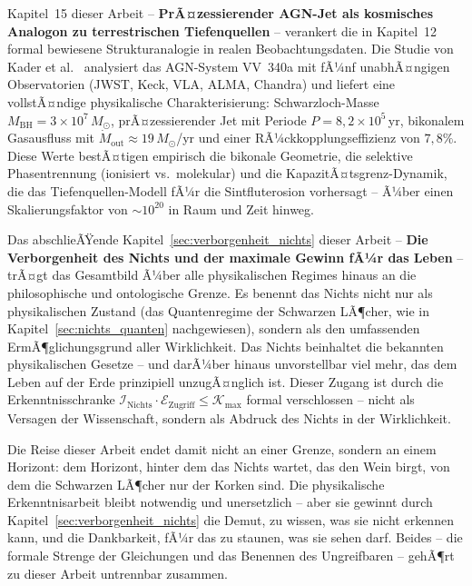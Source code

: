 ﻿\documentclass[12pt,a4paper]{report}
\begin{document}
\medskip

Kapitel~15 dieser Arbeit -- \textbf{PrÃ¤zessierender AGN-Jet als kosmisches Analogon zu terrestrischen Tiefenquellen} -- verankert die in Kapitel~12 formal bewiesene Strukturanalogie in realen Beobachtungsdaten. Die Studie von Kader et al.\ \cite{kader2026} analysiert das AGN-System VV~340a mit fÃ¼nf unabhÃ¤ngigen Observatorien (JWST, Keck, VLA, ALMA, Chandra) und liefert eine vollstÃ¤ndige physikalische Charakterisierung: Schwarzloch-Masse $M_\mathrm{BH} = 3 \times 10^7\,M_\odot$, prÃ¤zessierender Jet mit Periode $P = 8{,}2 \times 10^5$\,yr, bikonalem Gasausfluss mit $\dot{M}_\mathrm{out} \approx 19\,M_\odot$/yr und einer RÃ¼ckkopplungseffizienz von $7{,}8\%$. Diese Werte bestÃ¤tigen empirisch die bikonale Geometrie, die selektive Phasentrennung (ionisiert vs.\ molekular) und die KapazitÃ¤tsgrenz-Dynamik, die das Tiefenquellen-Modell fÃ¼r die Sintfluterosion vorhersagt -- Ã¼ber einen Skalierungsfaktor von $\sim 10^{20}$ in Raum und Zeit hinweg.

\medskip

Das abschlieÃŸende Kapitel~\ref{sec:verborgenheit_nichts} dieser Arbeit -- \textbf{Die Verborgenheit des Nichts und der maximale Gewinn fÃ¼r das Leben} -- trÃ¤gt das Gesamtbild Ã¼ber alle physikalischen Regimes hinaus an die philosophische und ontologische Grenze. Es benennt das Nichts nicht nur als physikalischen Zustand (das Quantenregime der Schwarzen LÃ¶cher, wie in Kapitel~\ref{sec:nichts_quanten} nachgewiesen), sondern als den umfassenden ErmÃ¶glichungsgrund aller Wirklichkeit. Das Nichts beinhaltet die bekannten physikalischen Gesetze -- und darÃ¼ber hinaus unvorstellbar viel mehr, das dem Leben auf der Erde prinzipiell unzugÃ¤nglich ist. Dieser Zugang ist durch die Erkenntnisschranke $\mathcal{I}_{\text{Nichts}} \cdot \mathcal{E}_{\text{Zugriff}} \leq \mathcal{K}_{\max}$ formal verschlossen -- nicht als Versagen der Wissenschaft, sondern als Abdruck des Nichts in der Wirklichkeit.

Die Reise dieser Arbeit endet damit nicht an einer Grenze, sondern an einem Horizont: dem Horizont, hinter dem das Nichts wartet, das den Wein birgt, von dem die Schwarzen LÃ¶cher nur der Korken sind. Die physikalische Erkenntnisarbeit bleibt notwendig und unersetzlich -- aber sie gewinnt durch Kapitel~\ref{sec:verborgenheit_nichts} die Demut, zu wissen, was sie nicht erkennen kann, und die Dankbarkeit, fÃ¼r das zu staunen, was sie sehen darf. Beides -- die formale Strenge der Gleichungen und das Benennen des Ungreifbaren -- gehÃ¶rt zu dieser Arbeit untrennbar zusammen.
\end{document}
